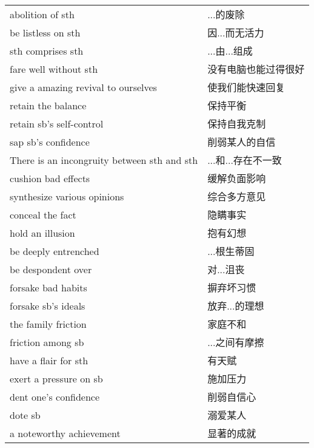 \begin{tabular}{ll}
    abolition of sth                            & ...的废除       \\
    be listless on sth                          & 因...而无活力     \\
    sth comprises sth                           & ...由...组成    \\
    fare well without sth                       & 没有电脑也能过得很好   \\
    give a amazing revival to ourselves         & 使我们能快速回复     \\
    retain the balance                          & 保持平衡         \\
    retain sb's self-control                    & 保持自我克制       \\
    sap sb's confidence                         & 削弱某人的自信      \\
    There is an incongruity between sth and sth & ...和...存在不一致 \\
    cushion bad effects                         & 缓解负面影响       \\
    synthesize various opinions                 & 综合多方意见       \\
    conceal the fact                            & 隐瞒事实         \\
    hold an illusion                            & 抱有幻想         \\
    be deeply entrenched                        & ...根生蒂固      \\
    be despondent over                          & 对...沮丧       \\
    forsake bad habits                          & 摒弃坏习惯        \\
    forsake sb's ideals                         & 放弃...的理想     \\
    the family friction                         & 家庭不和         \\
    friction among sb                           & ...之间有摩擦     \\
    have a flair for sth                        & 有天赋          \\
    exert a pressure on sb                      & 施加压力         \\
    dent one's confidence                       & 削弱自信心        \\
    dote sb                                     & 溺爱某人         \\
    a noteworthy achievement                    & 显著的成就        \\
\end{tabular}

